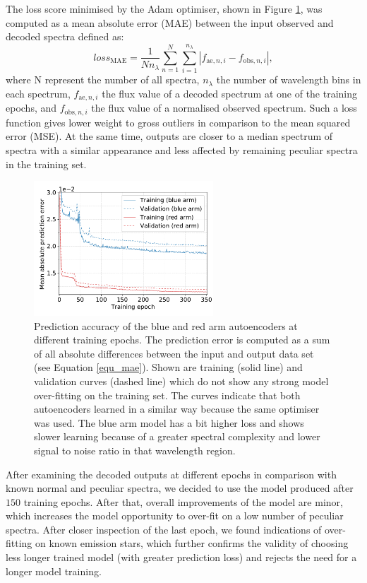 The loss score minimised by the Adam optimiser, shown in Figure \ref{fig:trainann}, was computed as a mean absolute error (MAE) between the input observed and decoded spectra defined as:
\begin{equation}
\label{equ_mae}
loss_\mathrm{MAE} = \frac{1}{N n_\lambda} \sum_{n=1}^{N}\sum_{i=1}^{n_\lambda}\left|f_{\mathrm{ae}, n, i} - f_{\mathrm{obs}, n, i}\right|,
\end{equation}
where N represent the number of all spectra, $n_\lambda$ the number of wavelength bins in each spectrum,  $f_{\mathrm{ae}, n, i}$ the flux value of a decoded spectrum at one of the training epochs, and $f_{\mathrm{obs}, n, i}$ the flux value of a normalised observed spectrum. Such a loss function gives lower weight to gross outliers in comparison to the mean squared error (MSE). At the same time, outputs are closer to a median spectrum of spectra with a similar appearance and less affected by remaining peculiar spectra in the training set. 

\begin{figure}
	\centering
	\includegraphics[width=0.6\textwidth]{ann_network_loss_ccd13.pdf}
	\caption{Prediction accuracy of the blue and red arm autoencoders at different training epochs. The prediction error is computed as a sum of all absolute differences between the input and output data set (see Equation \ref{equ_mae}). Shown are training (solid line) and validation curves (dashed line) which do not show any strong model over-fitting on the training set. The curves indicate that both autoencoders learned in a similar way because the same optimiser was used. The blue arm model has a bit higher loss and shows slower learning because of a greater spectral complexity and lower signal to noise ratio in that wavelength region.}
	\label{fig:trainann}
\end{figure}

After examining the decoded outputs at different epochs in comparison with known normal and peculiar spectra, we decided to use the model produced after $150$ training epochs. After that, overall improvements of the model are minor, which increases the model opportunity to over-fit on a low number of peculiar spectra. After closer inspection of the last epoch, we found indications of over-fitting on known emission stars, which further confirms the validity of choosing less longer trained model (with greater prediction loss) and rejects the need for a longer model training.

